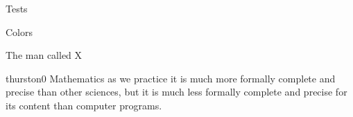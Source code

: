 \documentclass{PalisadesLakesArticle}
\begin{document}

\begin{plSection}{Tests}

\begin{plSection}{Colors}

\begin{plPlot}{}{}{}
\end{plPlot}
\begin{plTable}{}{}{}
\end{plTable}
\begin{plQuote}{}{}{}
\end{plQuote}
\begin{plAlgorithm}{}{}{}
\end{plAlgorithm}
\begin{plListing}{}{}{}
\end{plListing}

\begin{plNote}{}{}{}
\end{plNote}
\begin{plExercise}{}{}{}
\end{plExercise}

\begin{plDiagram}{}{}{}
\end{plDiagram}
\begin{plDefinition}{}{}{}
\end{plDefinition}
\begin{plExample}{}{}{}
\end{plExample}
\begin{plAxiom}{}{}{}
\end{plAxiom}
\begin{plAxiomSchema}{}{}{}
\end{plAxiomSchema}
\begin{plLemma}{}{}{}
\end{plLemma}
\begin{plTheorem}{}{}{}
\end{plTheorem}
\begin{plCorollary}{}{}{}
\end{plCorollary}

\end{plSection}%

\begin{plSection}{The man called X}
\begin{plQuote}
{}%
{thurston0}%
{Mathematics as we practice it is much more formally
complete and precise than
other sciences, but it is much less formally complete and precise
for its content than computer programs.
}
\end{plQuote}


\end{plSection}
\end{plSection}
\end{document}
